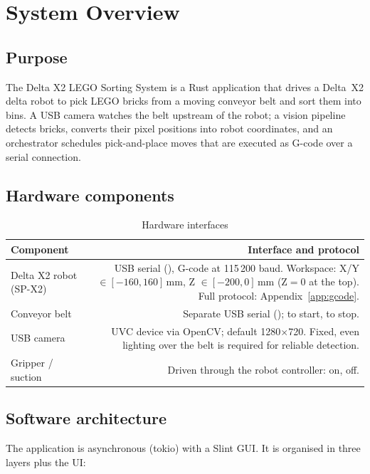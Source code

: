 \chapter{System Overview}

\section{Purpose}
%
The Delta X2 LEGO Sorting System is a Rust application that drives a
Delta~X2 delta robot to pick LEGO bricks from a moving conveyor belt and
sort them into bins. A USB camera watches the belt upstream of the robot;
a vision pipeline detects bricks, converts their pixel positions into
robot coordinates, and an orchestrator schedules pick-and-place moves that
are executed as G-code over a serial connection.

\section{Hardware components}
%
\begin{table}[h]
  \centering
  \begin{tabularx}{\textwidth}{lD}
    \toprule
    \textbf{Component} & \textbf{Interface and protocol} \\
    \midrule
    Delta X2 robot (SP-X2) & USB serial (), G-code at 115\,200 baud.
      Workspace: X/Y $\in [-160, 160]$\,mm, Z $\in [-200, 0]$\,mm (Z$=0$ at the top).
      Full protocol: Appendix~\ref{app:gcode}. \\
    Conveyor belt & Separate USB serial ();  to
      start,  to stop. \\
    USB camera & UVC device via OpenCV; default 1280$\times$720. Fixed, even
      lighting over the belt is required for reliable detection. \\
    Gripper / suction & Driven through the robot controller:  on,
       off. \\
    \bottomrule
  \end{tabularx}
  \caption{Hardware interfaces}
\end{table}

\section{Software architecture}
%
The application is asynchronous (tokio) with a Slint GUI. It is organised
in three layers plus the UI:

